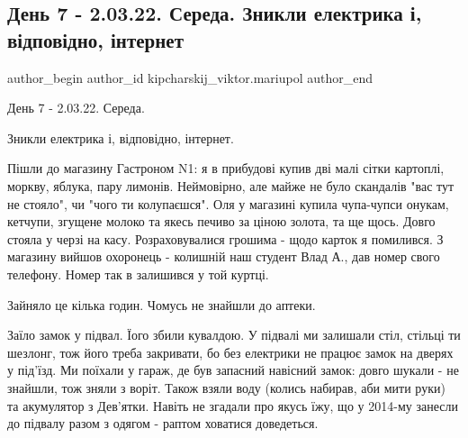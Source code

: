  
 
 
 
 

\subsection{День 7 - 2.03.22. Середа. Зникли електрика і, відповідно, інтернет}
\label{sec:02_03_2023.fb.kipcharskij_viktor.mariupol.1.den_7___2_03_22__ser}

\ifcmt
 author_begin
   author_id kipcharskij_viktor.mariupol
 author_end
\fi

День 7 - 2.03.22. Середа. 

Зникли електрика і, відповідно, інтернет.

Пішли до магазину Гастроном  N1: я в прибудові купив дві малі сітки картоплі,
моркву, яблука, пару лимонів. Неймовірно, але майже не було скандалів "вас тут
не стояло", чи "чого ти колупаєшся". Оля у магазині купила чупа-чупси онукам,
кетчупи, згущене молоко та якесь печиво за ціною золота, та ще щось. Довго
стояла у черзі на касу. Розраховувалися грошима - щодо карток я помилився. З
магазину вийшов охоронець - колишній наш студент Влад А., дав номер свого
телефону. Номер так в залишився у той куртці.

Зайняло це кілька годин. Чомусь не знайшли до аптеки.

Заїло замок у підвал. Їого збили кувалдою. У підвалі ми залишали стіл, стільці
ти шезлонг, тож його треба закривати, бо без електрики не працює замок на
дверях у під'їзд. Ми поїхали у гараж, де був запасний навісний замок: довго
шукали - не знайшли, тож зняли з воріт. Також взяли воду (колись набирав, аби
мити руки) та акумулятор з Дев'ятки. Навіть не згадали про якусь їжу, що у
2014-му занесли до підвалу разом з одягом - раптом ховатися доведеться.

